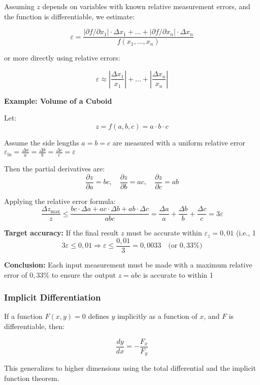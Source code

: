 Assuming \( z \) depends on variables with known relative measurement errors, and the function is differentiable, we estimate:

\[
\varepsilon = \frac{|\partial f / \partial x_1| \cdot \Delta x_1 + \dots + |\partial f / \partial x_n| \cdot \Delta x_n}{f(x_1, \dots, x_n)}
\]

or more directly using relative errors:

\[
\varepsilon \approx \left| \frac{\Delta x_1}{x_1} \right| + \dots + \left| \frac{\Delta x_n}{x_n} \right|
\]

\textbf{Example: Volume of a Cuboid}

Let:
\[
z = f(a, b, c) = a \cdot b \cdot c
\]

Assume the side lengths \( a = b = c \) are measured with a uniform relative error \( \varepsilon_{\text{in}} = \frac{\Delta a}{a} = \frac{\Delta b}{b} = \frac{\Delta c}{c} = \varepsilon \)

Then the partial derivatives are:
\[
\frac{\partial z}{\partial a} = b c, \quad
\frac{\partial z}{\partial b} = a c, \quad
\frac{\partial z}{\partial c} = a b
\]

Applying the relative error formula:
\[
\frac{\Delta z_{\max}}{z} \leq \frac{bc \cdot \Delta a + ac \cdot \Delta b + ab \cdot \Delta c}{abc}
= \frac{\Delta a}{a} + \frac{\Delta b}{b} + \frac{\Delta c}{c} = 3 \varepsilon
\]

\textbf{Target accuracy:}  
If the final result \( z \) must be accurate within \( \varepsilon_z = 0{,}01 \) (i.e., 1%
\[
3 \varepsilon \leq 0{,}01 \Rightarrow \varepsilon \leq \frac{0{,}01}{3} = \boxed{0{,}0033} \quad \text{(or } 0{,}33\% \text{)}
\]

\textbf{Conclusion:}  
Each input measurement must be made with a maximum relative error of \( \boxed{0{,}33\%} \) to ensure the output \( z = abc \) is accurate to within 1%

\subsubsection*{Implicit Differentiation}

If a function \( F(x, y) = 0 \) defines \( y \) implicitly as a function of \( x \), and \( F \) is differentiable, then:

\[
\frac{dy}{dx} = -\frac{F_x}{F_y}
\]

This generalizes to higher dimensions using the total differential and the implicit function theorem.


